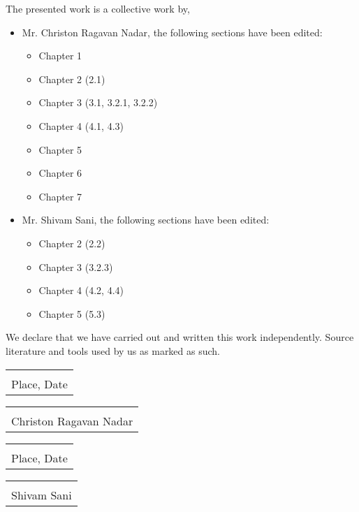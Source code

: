 \documentclass[
11pt, %
english, %
singlespacing, %
headsepline, %
]{mediaproject} %
\begin{document}
\begin{DeclarationOFIndependence}
\addchaptertocentry{\DeclarationOIname} 
The presented work is a collective work by,

\begin{itemize} 
    \item Mr. Christon Ragavan Nadar, the following sections have been edited:
    \begin{itemize} 
    \item Chapter 1 
    \item Chapter 2 (2.1) 
    \item Chapter 3 (3.1, 3.2.1, 3.2.2)
    \item Chapter 4 (4.1, 4.3)
    \item Chapter 5
    \item Chapter 6
    \item Chapter 7
    \end{itemize}
\end{itemize}



\begin{itemize}
\item Mr. Shivam Sani, the following sections have been edited:
\begin{itemize}
    \item Chapter 2 (2.2) 
    \item Chapter 3 (3.2.3)
    \item Chapter 4 (4.2, 4.4)
    \item Chapter 5 (5.3)
\end{itemize}
\end{itemize}


We declare that we have carried out and written this work independently. Source literature and tools used by us as marked as such.




\vspace{2cm}
\begin{tabular}{p{5cm}}
	\dotfill \\
	Place, Date
\end{tabular}
\hfill
\begin{tabular}{p{5cm}}
	\dotfill \\
	Christon Ragavan Nadar
\end{tabular}

\vspace{2cm}
\begin{tabular}{p{5cm}}
	\dotfill \\
	Place, Date
\end{tabular}
\hfill
\begin{tabular}{p{5cm}}
	\dotfill \\
	Shivam Sani
\end{tabular}


\end{DeclarationOFIndependence}
\newpage
\end{document}
